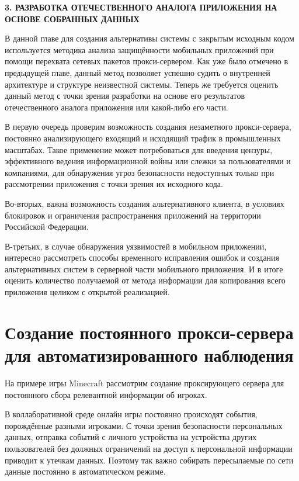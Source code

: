 \newpage
\begin{center}
  \textbf{\large 3. РАЗРАБОТКА ОТЕЧЕСТВЕННОГО АНАЛОГА ПРИЛОЖЕНИЯ НА ОСНОВЕ СОБРАННЫХ ДАННЫХ}
\end{center}

В данной главе для создания альтернативы системы с закрытым исходным кодом используется методика анализа защищённости мобильных приложений при помощи перехвата сетевых пакетов прокси-сервером. Как уже было отмечено в предыдущей главе, данный метод позволяет успешно судить о внутренней архитектуре и структуре неизвестной системы. Теперь же требуется оценить данный метод с точки зрения разработки на основе его результатов отечественного аналога приложения или какой-либо его части.

В первую очередь проверим возможность создания незаметного прокси-сервера, постоянно анализирующего входящий и исходящий трафик в промышленных масштабах. Такое применение может потребоваться для введения цензуры, эффективного ведения информационной войны или слежки за пользователями и компаниями, для обнаружения угроз безопасности недоступных только при рассмотрении приложения с точки зрения их исходного кода.

Во-вторых, важна возможность создания альтернативного клиента, в условиях блокировок и ограничения распространения приложений на территории Российской Федерации.

В-третьих, в случае обнаружения уязвимостей в мобильном приложении, интересно рассмотреть способы временного исправления ошибок и создания альтернативных систем в серверной части мобильного приложения. И в итоге оценить количество получаемой от метода информации для копирования всего приложения целиком с открытой реализацией.

\section{Создание постоянного прокси-сервера для автоматизированного наблюдения}

На примере игры Minecraft рассмотрим создание проксирующего сервера для постоянного сбора релевантной информации об игроках.

В коллаборативной среде онлайн игры постоянно происходят события, порождённые разными игроками. С точки зрения безопасности персональных данных, отправка событий с личного устройства на устройства других пользователей без должных ограничений на доступ к персональной информации приводит к утечкам данных. Поэтому так важно собирать пересылаемые по сети данные постоянно в автоматическом режиме.

